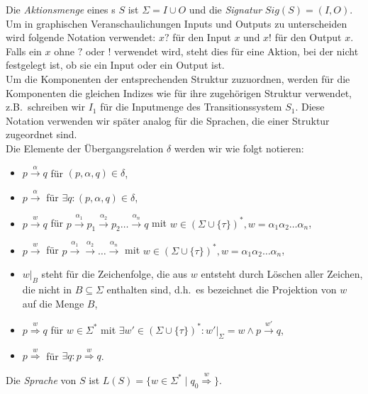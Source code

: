 Die \emph{Aktionsmenge} eines \EIO{}s $S$ ist $\Sigma = I\cup O$ und die
\emph{Signatur} $Sig(S)=(I,O)$.\\
Um in graphischen Veranschaulichungen Inputs und Outputs zu unterscheiden wird
folgende Notation verwendet: $x?$ für den Input $x$ und $x!$ für den Output
$x$. Falls ein $x$ ohne $?$ oder $!$ verwendet wird, steht dies für eine
Aktion, bei der nicht festgelegt ist, ob sie ein Input oder ein Output ist.\\
Um die Komponenten der entsprechenden Struktur zuzuordnen, werden für
die Komponenten die gleichen Indizes wie für ihre zugehörigen Struktur
verwendet, z.B.\ schreiben wir $I_1$ für die Inputmenge des Transitionssystem $S_1$.
Diese Notation verwenden wir später analog für die Sprachen, die einer Struktur
zugeordnet sind.\\
Die Elemente der Übergangsrelation $\delta$ werden wir wie folgt notieren:
\begin{itemize}
  \item $p\overset{\alpha}{\rightarrow} q$ für $(p,\alpha ,q)\in\delta$,
  \item $p\overset{\alpha}{\rightarrow}$ für $\exists q: (p,\alpha ,q)\in\delta$,
  \item $p\overset{w}{\rightarrow} q$ für $p \overset{\alpha _1}{\rightarrow}
    p_1 \overset{\alpha _2}{\rightarrow} p_2\dots \overset{\alpha
    _n}{\rightarrow} q$ mit $w\in (\Sigma\cup\{\tau\})^*, w=\alpha _1\alpha
    _2\dots \alpha _n$,
  \item $p\overset{w}{\rightarrow}$ für $p \overset{\alpha _1}{\rightarrow}
    \overset{\alpha _2}{\rightarrow} \dots \overset{\alpha _n}{\rightarrow}$
    mit $w\in (\Sigma\cup\{\tau\})^*, w=\alpha _1\alpha _2\dots \alpha _n$,
  \item $w|_B$ steht für die Zeichenfolge, die aus $w$ entsteht durch Löschen
    aller Zeichen, die nicht in $B\subseteq\Sigma$ enthalten sind, d.h.\ es
    bezeichnet die Projektion von $w$ auf die Menge $B$,
  \item $p\overset{w}{\Rightarrow} q$ für $w\in\Sigma^*$ mit $\exists
    w'\in(\Sigma\cup\{\tau\})^*:w'|_{\Sigma}=w\wedge p\overset{w'}{\rightarrow}
    q$,
  \item $p\overset{w}{\Rightarrow}$ für $\exists q:p\overset{w}{\Rightarrow}
    q$.
\end{itemize}
Die \emph{Sprache} von $S$ ist
$L(S)=\{w\in\Sigma^*\mid q_0\overset{w}{\Rightarrow}\}$.

